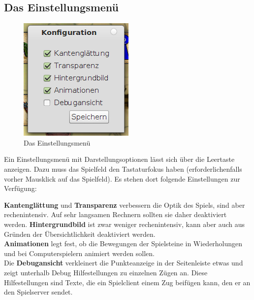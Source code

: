 \documentclass[a4paper, ngerman]{scrartcl}
\begin{document}
\subsection{Das Einstellungsmenü}
	 \begin{figure}[h]
		\centering
		\label{fig:Configuration}
		\includegraphics[scale=0.5]{bilder/configuration}
		\caption{Das Einstellungsmenü}
	\end{figure}
	
	Ein Einstellungsmenü mit Darstellungsoptionen lässt
sich über die Leertaste anzeigen. Dazu muss das
Spielfeld den Tastaturfokus haben (erforderlichenfalls
vorher Mausklick auf das Spielfeld). Es stehen dort
folgende Einstellungen zur Verfügung:

\textbf{Kantenglättung} und \textbf{Transparenz} verbessern die
Optik des Spiels, sind aber rechenintensiv. Auf sehr
langsamen Rechnern sollten sie daher deaktiviert
werden. \textbf{Hintergrundbild} ist zwar weniger rechenintensiv, kann
aber auch aus Gründen der Übersichtlichkeit deaktiviert
werden.\\
\textbf{Animationen} legt fest, ob die Bewegungen der Spielsteine in Wiederholungen und bei Computerspielern
animiert werden sollen.\\
Die \textbf{Debugansicht} verkleinert die Punkteanzeige in
der Seitenleiste etwas und zeigt unterhalb Debug
Hilfestellungen zu einzelnen Zügen an. Diese Hilfestellungen sind Texte, die ein Spielclient einem Zug
beifügen kann, den er an den Spielserver sendet.
	
\end{document}
